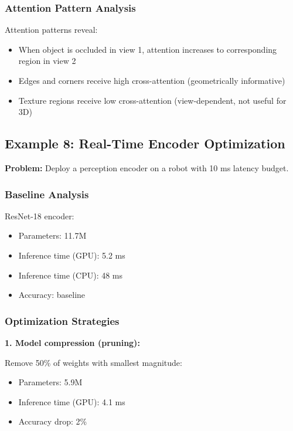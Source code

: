 \subsubsection{Attention Pattern Analysis}

Attention patterns reveal:
\begin{itemize}
    \item When object is occluded in view 1, attention increases to corresponding region in view 2
    \item Edges and corners receive high cross-attention (geometrically informative)
    \item Texture regions receive low cross-attention (view-dependent, not useful for 3D)
\end{itemize}


\subsection{Example 8: Real-Time Encoder Optimization}

\textbf{Problem:} Deploy a perception encoder on a robot with 10 ms latency budget.

\subsubsection{Baseline Analysis}

ResNet-18 encoder:
\begin{itemize}
    \item Parameters: 11.7M
    \item Inference time (GPU): 5.2 ms
    \item Inference time (CPU): 48 ms
    \item Accuracy: baseline
\end{itemize}

\subsubsection{Optimization Strategies}

\textbf{1. Model compression (pruning):}

Remove 50\% of weights with smallest magnitude:
\begin{itemize}
    \item Parameters: 5.9M
    \item Inference time (GPU): 4.1 ms
    \item Accuracy drop: 2\%
\end{itemize}

